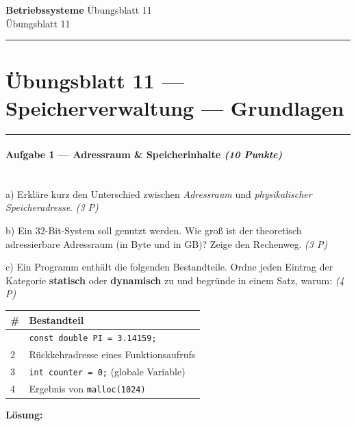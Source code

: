 \documentclass[11pt, a4paper]{article}
\providecommand{\nichttitle}{Übungsblatt}
\providecommand{\nichtsubtitle}{}
\renewcommand{\nichttitle}{Betriebssysteme}
\renewcommand{\nichtsubtitle}{Übungsblatt 11}
\begin{document}
\begin{center}
{\Large\bfseries\color{accent}\nichttitle}
\ifx\nichtsubtitle\empty\else
  \\[2pt]{\normalsize\color{accent!80!black}\nichtsubtitle}
\fi
\\[2pt]
\color{accent}\rule{0.4\linewidth}{0.8pt}\color{black}
\end{center}
\vspace{4pt}


\section{Übungsblatt 11 — Speicherverwaltung — Grundlagen}


\noindent\textcolor{rulegray}{\rule{\linewidth}{0.4pt}}


\paragraph{Aufgabe 1 — Adressraum \& Speicherinhalte \textit{(10 Punkte)}}\mbox{}\\[2pt]

a) Erkläre kurz den Unterschied zwischen \textit{Adressraum} und \textit{physikalischer Speicheradresse}. \textit{(3 P)}


b) Ein 32-Bit-System soll genutzt werden. Wie groß ist der theoretisch adressierbare Adressraum (in Byte und in GB)? Zeige den Rechenweg. \textit{(3 P)}


c) Ein Programm enthält die folgenden Bestandteile. Ordne jeden Eintrag der Kategorie \textbf{statisch} oder \textbf{dynamisch} zu und begründe in einem Satz, warum: \textit{(4 P)}



{\small
\begin{tabularx}{\linewidth}{XX}
\hline
\rowcolor{tableheadbg}
{\color{white}\textbf{\#}} & {\color{white}\textbf{Bestandteil}} \\[2pt]
\hline
\endhead
\hline
\endfoot
1 & \texttt{const double PI = 3.14159;} \\
2 & Rückkehradresse eines Funktionsaufrufs \\
3 & \texttt{int counter = 0;} (globale Variable) \\
4 & Ergebnis von \texttt{malloc(1024)} \\
\end{tabularx}
}


\textbf{Lösung:}
\end{document}

